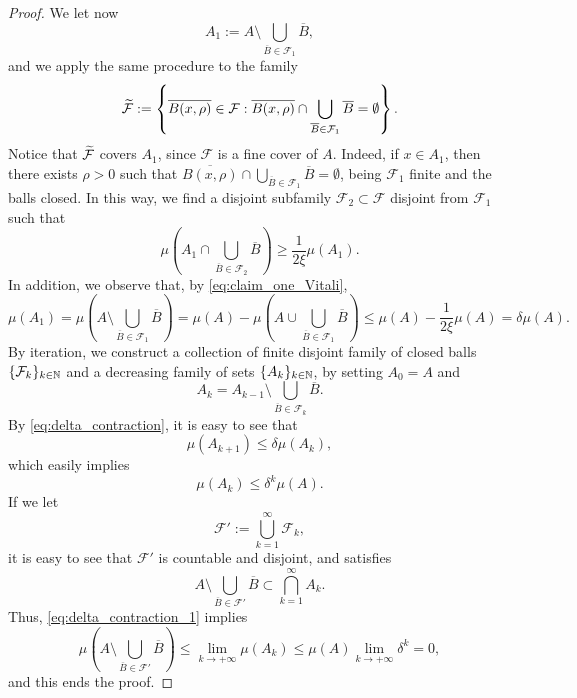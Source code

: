 \begin{proof}
We let now $$A_{1} := A \setminus \bigcup_{ \overline{B} \in \mathcal{F}_{1}}  \overline{B},$$
and we apply the same procedure to the family 
\begin{equation*}
\widetilde{ \mathcal{F}} := \left \{ \overline{B(x, \rho)} \in \mathcal{F} :  \overline{B(x, \rho)} \cap \bigcup_{ \overline{B} \in \mathcal{F}_1}  \overline{B} = \emptyset \right \}.
\end{equation*}
Notice that $\widetilde{ \mathcal{F}}$ covers $A_{1}$, since $\mathcal{F}$ is a fine cover of $A$. Indeed, if $x \in A_{1}$, then there exists $\rho > 0$ such that $\overline{B(x, \rho)} \cap \bigcup_{ \overline{B} \in \mathcal{F}_1}  \overline{B} = \emptyset$, being $\mathcal{F}_1$ finite and the balls closed.
In this way, we find a disjoint subfamily $\mathcal{F}_{2} \subset \mathcal{F}$ disjoint from $\mathcal{F}_{1}$ such that
\begin{equation*}
\mu \left ( A_{1} \cap \bigcup_{ \overline{B} \in \mathcal{F}_{2}}  \overline{B} \right ) \ge \frac{1}{2 \xi} \mu(A_{1}).
\end{equation*}
In addition, we observe that, by \eqref{eq:claim_one_Vitali},
\begin{equation} \label{eq:delta_contraction}
\mu(A_{1}) = \mu \left ( A \setminus \bigcup_{ \overline{B} \in \mathcal{F}_{1}}  \overline{B} \right ) = \mu(A) - \mu \left ( A \cup \bigcup_{ \overline{B} \in \mathcal{F}_{1}}  \overline{B} \right ) \le \mu(A) - \frac{1}{2 \xi} \mu(A)  = \delta \mu(A).
\end{equation}
By iteration, we construct a collection of finite disjoint family of closed balls $\{\mathcal{F}_{k}\}_{k \in \mathbb{N}}$ and a decreasing family of sets $\{A_{k}\}_{k \in \mathbb{N}}$, by setting $A_{0} = A$ and
\begin{equation*} 
A_{k} = A_{k - 1} \setminus \bigcup_{ \overline{B} \in \mathcal{F}_{k}}  \overline{B}.
\end{equation*}
By \eqref{eq:delta_contraction}, it is easy to see that
\begin{equation*}
\mu(A_{k + 1}) \le \delta \mu(A_{k}),
\end{equation*}
which easily implies
\begin{equation} \label{eq:delta_contraction_1}
\mu(A_{k}) \le \delta^{k} \mu(A).
\end{equation}
If we let $$\mathcal{F}' := \bigcup_{k = 1}^{\infty} \mathcal{F}_{k},$$
it is easy to see that $\mathcal{F}'$ is countable and disjoint, and satisfies
\begin{equation*}
A \setminus \bigcup_{ \overline{B} \in \mathcal{F}'}  \overline{B} \subset \bigcap_{k = 1}^{\infty} A_{k}.
\end{equation*} 
Thus, \eqref{eq:delta_contraction_1} implies
\begin{equation*}
\mu \left ( A \setminus \bigcup_{ \overline{B} \in \mathcal{F}'} \overline{B} \right ) \le \lim_{k \to + \infty} \mu(A_{k}) \le \mu(A) \lim_{k \to + \infty} \delta^{k} = 0,
\end{equation*}
and this ends the proof.
\end{proof}

